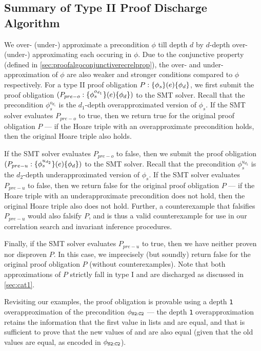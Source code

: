 \subsection{Summary of Type II Proof Discharge Algorithm}
\label{sec:cat2summary}
We over- (under-) approximate a precondition $\phi$ till depth $d$ by $d$-depth over- (under-) approximating
each \recursiveRelation{} occuring in $\phi$.
Due to the conjunctive \recursiveRelation{} property (defined in \cref{sec:proofalgoconjunctiverecrelprop}),
the over- and under-approximation of $\phi$ are also weaker and stronger conditions compared to $\phi$
respectively.
For a type II proof obligation $P: \{\phi_s\}(e)\{\phi_d\}$, we first
submit the proof obligation $(P_{pre-o}: \{\phi^{o_{d_1}}_s\}(e)\{\phi_d\})$
to the SMT solver. Recall that the precondition $\phi^{o_{d_1}}_s$
is the $d_1$-depth overapproximated version of $\phi_s$.
If the SMT solver evaluates $P_{{pre-o}}$ to true, then we return true for
the original proof obligation $P$ --- if the
Hoare triple with an overapproximate precondition
holds, then the original Hoare triple
also holds.

If the SMT solver evaluates $P_{pre-o}$ to false, then we submit
the proof obligation $(P_{pre-u}: \{\phi^{u_{d_2}}_s\}(e)\{\phi_d\})$
to the SMT solver. Recall that the precondition $\phi^{u_{d_2}}_s$
is the $d_2$-depth underapproximated version of $\phi_s$.
If the SMT solver evaluates $P_{pre-u}$ to false, then we return false for
the original proof obligation $P$ --- if the
Hoare triple with an underapproximate precondition
does not hold, then the original Hoare triple
also does not hold. Further, a counterexample that
falsifies $P_{pre-u}$ would also falsify $P$,
and is thus a valid counterexample for use in our correlation search and invariant inference procedures.

Finally, if the SMT solver evaluates $P_{pre-u}$ to true, then we have neither
proven nor disproven $P$.
In this case, we imprecisely (but soundly) return false for the
original proof obligation $P$ (without counterexamples).
Note that both approximations of $P$ strictly fall in type I and are
discharged as discussed in \cref{sec:cat1}.

Revisiting our examples, the proof obligation 
is provable using a depth {\tt 1} overapproximation of the
precondition $\phi_{{\tt S2:C2}}$ --- the depth {\tt 1} overapproximation retains the
information that the first value in lists  and 
are equal, and that is sufficient to prove that
the new values of  and  are also equal
(given that the old values are equal, as encoded in $\phi_{{\tt S2:C2}}$).

